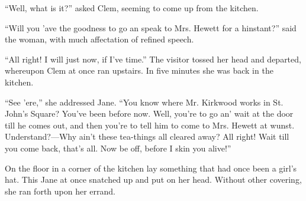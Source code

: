 ``Well, what is it?'' asked Clem, seeming to come up from the kitchen.

``Will you 'ave the goodness to go an speak to Mrs. Hewett for a
hinstant?'' said the woman, with much affectation of refined speech.

``All right! I will just now, if I've time.'' The visitor tossed her
head and departed, whereupon Clem at once ran upstairs. In five minutes
she was back in the kitchen.

{}``See 'ere,'' she addressed Jane. ``You know where Mr. Kirkwood works
in St. John's Square? You've been before now. Well, you're to go an'
wait at the door till he comes out, and then you're to tell him to come
to Mrs. Hewett at wunst. Understand?---Why ain't these tea-things all
cleared away? All right! Wait till you come back, that's all. Now be
off, before I skin you alive!''

On the floor in a corner of the kitchen lay something that had once been
a girl's hat. This Jane at once snatched up and put on her head. Without
other covering, she ran forth upon her errand.
